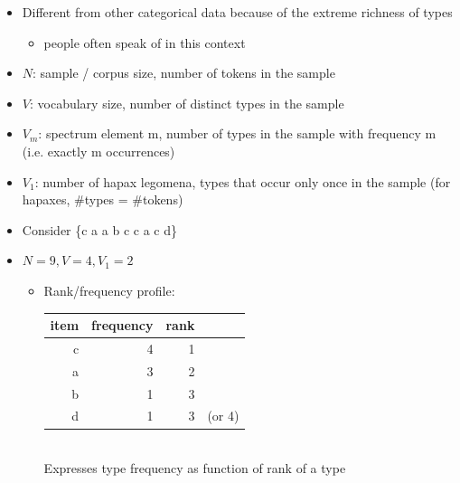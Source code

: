 \documentclass[a4paper,landscape,headrule,footrule,dvips]{foils}
\begin{document}
\begin{CJK}{UTF8}{min}
\begin{itemize}
\item Different from other categorical data because of
the extreme richness of types
\begin{itemize}
\item people often speak of  in this context
\end{itemize}
\end{itemize}
\begin{itemize}
\item $N$: sample / corpus size, number of tokens in the sample
\item $V$: vocabulary size, number of distinct types in the sample
\item $V_m$: spectrum element m, number of types in the sample
with frequency m (i.e. exactly m occurrences)
\item $V_1$: number of hapax legomena, types that occur only
once in the sample (for hapaxes, \#types = \#tokens)
\item Consider \{c a a b c c a c d\}
\item $N = 9, V = 4, V_1 = 2$
  \begin{itemize}
  \item Rank/frequency profile:
    \begin{tabular}[t]{rrrl}
      item & frequency &  rank \\ \hline
      c & 4 & 1\\
      a & 3 & 2\\
      b & 1 & 3 \\
      d & 1 & 3 & (or 4) 
    \end{tabular}
\\ Expresses type frequency as function of rank of a type
\end{itemize}
\end{itemize}



\end{CJK}
\end{document}
